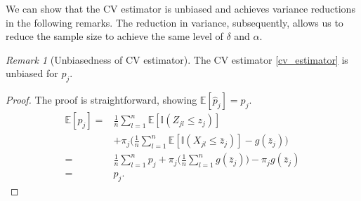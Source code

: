 \documentclass[preprint]{oscmjournal}
\theoremstyle{remark}
\newtheorem{remark}{Remark}
\begin{document}
We can show that the CV estimator is unbiased and achieves variance reductions in the following remarks. The reduction in variance, subsequently, allows us to reduce the sample size to achieve the same level of $\delta$ and $\alpha$.

\begin{remark}[Unbiasedness of CV estimator]
The CV estimator \eqref{cv_estimator} is unbiased for $p_j$.
\end{remark}
\begin{proof}
The proof is straightforward, showing $\mathbb E[\hat{p}_j] = p_j$.
\begin{align}
\mathbb E[\hat p_j] =& \frac{1}{n}\sum_{l=1}^n\mathbb E[\mathbb I(Z_{jl}\leq z_j)] \nonumber \\
&+\pi_j \bigg(\frac{1}{n}\sum_{l=1}^n\mathbb E[ \mathbb I(X_{jl}\leq \bar z_j)]-g(\bar z_j) \bigg) \\
=& \frac{1}{n}\sum_{l=1}^np_j + \pi_j \bigg(\frac{1}{n}\sum_{l=1}^n g(\bar z_j) \bigg) - \pi_j g(\bar z_j) \\
=& p_j.
\end{align}
\end{proof}
\end{document}
